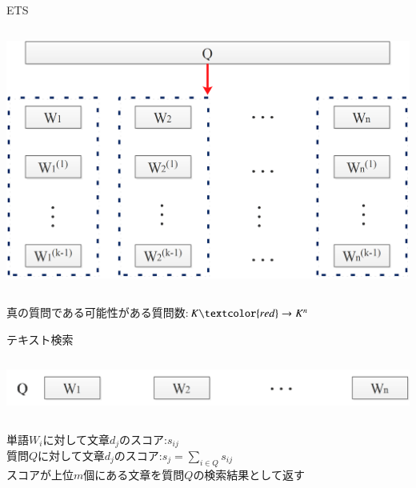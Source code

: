 \documentclass[14pt,xcolor=dvipsnames,table,dvipdfmx]{beamer}
\begin{document}
\begin{frame}{ETS}
	\begin{columns}[t]
		\begin{column}{0.8\textwidth} %
			\includegraphics[width=\columnwidth]{rk8.png}
		\end{column}
	\end{columns}
	\begin{block}{}
		真の質問である可能性がある質問数:$K \textcolor{red}\rightarrow K^n$	
	\end{block}
\end{frame}

\begin{frame}{テキスト検索}
\fontsize{12pt}{7.2}\selectfont
	\begin{columns}[t]
		\begin{column}{0.8\textwidth} %
			\includegraphics[width=\columnwidth]{rk9.png}
		\end{column}
	\end{columns}
	\begin{block}{}
		単語$W_i$に対して文章$d_j$のスコア:$s_{ij}$ \\
		質問$Q$に対して文章$d_j$のスコア:$s_{j}=\sum_{i \in Q}s_{ij}$ \\
		スコアが上位$m$個にある文章を質問$Q$の検索結果として返す
	\end{block}
\end{frame}
\end{document}
